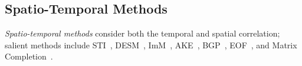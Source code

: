 


\subsection{Spatio-Temporal Methods}   \label{sec:rw_spatial_temporal}
{\em Spatio-temporal methods} consider both the
temporal and spatial correlation; salient methods include
STI~\cite{Jian-Zhong:STI}, DESM~\cite{li2008data}, ImM~\cite{Lim:robust},
AKE~\cite{pan2010k}, BGP~\cite{osborne2012real}, EOF~\cite{beckers2003eof, kondrashov2006spatio},
and Matrix Completion~\cite{majumdar2011increasing}.

